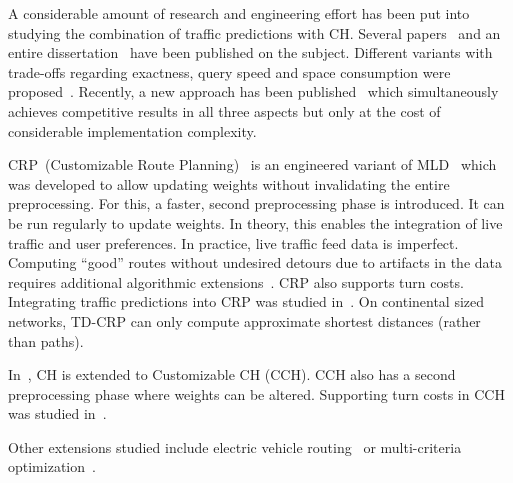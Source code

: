 \documentclass[manuscript,review]{acmart}
\begin{document}
A considerable amount of research and engineering effort has been put into studying the combination of traffic predictions with CH.
Several papers~\cite{bdsv-tdch-09,bgns-tdcha-10,klsv-dtdch-10,bgsv-mtdtt-13} and an entire dissertation~\cite{b-tdrpc-14} have been published on the subject.
Different variants with trade-offs regarding exactness, query speed and space consumption were proposed~\cite{bgsv-mtdtt-13}.
Recently, a new approach has been published~\cite{swz-sfert-20} which simultaneously achieves competitive results in all three aspects but only at the cost of considerable implementation complexity.

CRP~(Customizable Route Planning)~\cite{dgpw-crprn-13} is an engineered variant of MLD~\cite{swz-umlgt-02} which was developed to allow updating weights without invalidating the entire preprocessing.
For this, a faster, second preprocessing phase is introduced.
It can be run regularly to update weights.
In theory, this enables the integration of live traffic and user preferences.
In practice, live traffic feed data is imperfect.
Computing ``good'' routes without undesired detours due to artifacts in the data requires additional algorithmic extensions~\cite{dss-tarrn-18}.
CRP also supports turn costs.
Integrating traffic predictions into CRP was studied in~\cite{bdpw-dtdrp-16}.
On continental sized networks, TD-CRP can only compute approximate shortest distances (rather than paths).

In~\cite{dsw-cch-15}, CH is extended to Customizable CH (CCH).
CCH also has a second preprocessing phase where weights can be altered.
Supporting turn costs in CCH was studied in~\cite{bwzz-cchtc-20}.

Other extensions studied include electric vehicle routing~\cite{DBLP:journals/algorithmica/BaumDPSWZ20,DBLP:conf/aaai/EisnerFS11} or multi-criteria optimization~\cite{fns-opca-14,gks-rpfof-10}.

\end{document}
